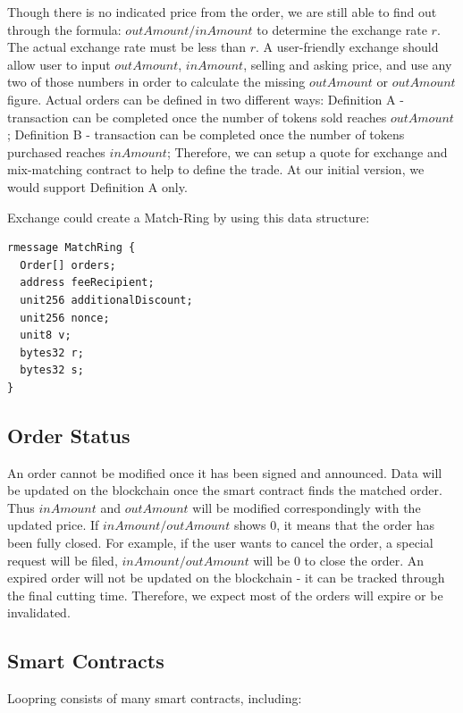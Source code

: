 \documentclass[UTF8,nofonts]{article}
\begin{document}
Though there is no indicated price from the order, we are still able to find out through the formula: $outAmount / inAmount$ to determine the exchange rate $r$. The actual exchange rate must be less than $r$. A user-friendly exchange should allow user to input $outAmount$, $inAmount$, selling and asking price, and use any two of those numbers in order to calculate the missing $outAmount$ or $outAmount$ figure.
Actual orders can be defined in two different ways: Definition A - transaction can be completed once the number of tokens sold reaches $outAmount$ ; Definition B - transaction can be completed once the number of tokens purchased reaches $inAmount$; Therefore, we can setup a quote for exchange and mix-matching contract to help to define the trade. At our initial version, we would support Definition A only.

Exchange could create a Match-Ring by using this data structure:
\begin{verbatim}
rmessage MatchRing {
  Order[] orders;
  address feeRecipient;
  unit256 additionalDiscount;
  unit256 nonce;
  unit8 v;
  bytes32 r;
  bytes32 s;
}
\end{verbatim}


\subsection{Order Status\label{sec: orderstate}}


An order cannot be modified once it has been signed and announced. Data will be updated on the blockchain once the smart contract finds the matched order. Thus $inAmount$ and $outAmount$ will be modified correspondingly with the updated price. If $inAmount / outAmount$ shows 0,  it means that the order has been fully closed. For example, if the user wants to cancel the order, a special request will be filed,  $inAmount / outAmount$ will be 0 to close the order. An expired order will not be updated on the blockchain - it can be tracked through the final cutting time. Therefore, we expect most of the orders will expire or be invalidated.

\subsection{Smart Contracts\label{sec: contracts}}

Loopring consists of many smart contracts, including:
\end{document}
